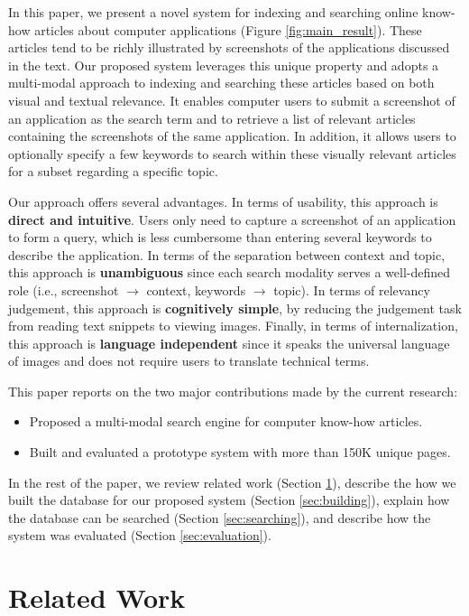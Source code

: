 \documentclass{www2010-submission}
\begin{document}
In this paper, we present a novel system for indexing and searching
online know-how articles about computer applications (Figure
\ref{fig:main_result}).  These articles tend to be richly illustrated
by screenshots of the applications discussed in the text. Our proposed
system leverages this unique property and adopts a multi-modal
approach to indexing and searching these articles based on both visual
and textual relevance.  It enables computer users to submit a
screenshot of an application as the search term and to retrieve a list
of relevant articles containing the screenshots of the same
application. In addition, it allows users to optionally specify a few
keywords to search within these visually relevant articles for a
subset regarding a specific topic.

Our approach offers several advantages. In terms of usability, this
approach is \textbf{direct and intuitive}. Users only need to capture a
screenshot of an application to form a query, which is less cumbersome
than entering several keywords to describe the application. In terms
of the separation between context and topic, this approach is
\textbf{unambiguous} since each search modality serves a well-defined
role (i.e., screenshot $\rightarrow$ context, keywords
$\rightarrow$ topic). In terms of relevancy judgement, this approach 
is \textbf{cognitively simple}, by reducing the judgement task from
reading text snippets to viewing images.  Finally, in terms of
internalization, this approach is \textbf{language independent} since
it speaks the universal language of images and does not require
users to translate technical terms.

This paper reports on the two major contributions made by the current research:
\begin{itemize}
\item Proposed a multi-modal search engine for computer know-how articles.
\item Built and evaluated a prototype system with more than 150K unique
pages.
\end{itemize}
In the rest of the paper, we review related work (Section
\ref{sec:related_work}), describe the how we built the database for our
proposed system (Section \ref{sec:building}), explain how the database
can be searched (Section \ref{sec:searching}), and describe how the
system was evaluated (Section \ref{sec:evaluation}).

\section{Related Work}
\label{sec:related_work}
\end{document}
